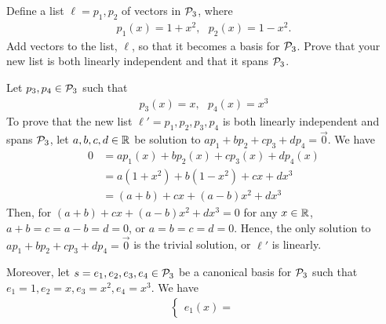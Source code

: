\begin{question}
	\normalfont
	
	
	Define a list $\ell = p_1, p_2$ \hspace{.1cm}of vectors in $\P_3$, where
	\begin{align*}
		p_1(x) = 1+x^2,\ \ \ 
		p_2(x) = 1-x^2.
	\end{align*}
	Add vectors to the list, $\ell$, so that it becomes a basis for $\P_3$.  Prove that your new list is both linearly independent and that it spans $\P_3$.
\end{question}

\begin{sol}
    Let $p_3,p_4\in\P_3$ such that 
    \[
        \begin{aligned}
            p_3(x)=x,\ \ \
            p_4(x)=x^3
        \end{aligned}
    \]
    To prove that the new list $\ell'=p_1,p_2,p_3,p_4$ is both linearly independent and spans $\P_3$, let $a,b,c,d\in\R$ be solution to $ap_1+bp_2+cp_3+dp_4=\vec{0}$. We have 
    \[
        \begin{aligned}
            0 &= ap_1(x)+bp_2(x)+cp_3(x)+dp_4(x)\\
              &= a(1+x^2)+b(1-x^2)+cx+dx^3\\
              &= (a+b)+cx+(a-b)x^2+dx^3   
        \end{aligned}
    \]
    Then, for $(a+b)+cx+(a-b)x^2+dx^3=0$ for any $x\in\R$, $a+b=c=a-b=d=0$, or $a=b=c=d=0$. Hence, the only solution to $ap_1+bp_2+cp_3+dp_4=\vec{0}$ is the trivial solution, or $\ell'$ is linearly.

    Moreover, let $s=e_1,e_2,e_3,e_4\in\P_3$ be a canonical basis for $\P_3$ such that $e_1=1,e_2=x,e_3=x^2,e_4=x^3$. We have
    \begin{align*}
        \begin{cases}
            e_1(x)=
        \end{cases}
    \end{align*}
\end{sol}

